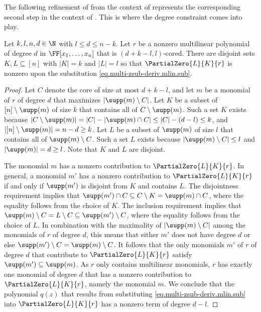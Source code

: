 The following refinement of  from the context of  represents the corresponding second step in the context of . This is where the degree constraint comes into play.

\begin{lemma}\label{lemma.rfe-hits-multiaffine-coreform}
Let \(k,l,n,d \in\N\) with $l \le d \le n-k$. 
Let \(r\) be a nonzero multilinear polynomial of degree $d$ in $\FF[x_1,\dots,x_n]$ that is \((d+k-l, l)\)-cored.
There are disjoint sets \(K,L\subseteq [n]\) with \(|K|=k\) and
\(|L|=l\) so that \(\PartialZero{L}{K}{r}\) is nonzero upon the substitution \eqref{eq.multi-zsub-deriv.mlin.sub}.
\end{lemma}
\begin{proof}
  Let $C$ denote the core of size at most $d+k-l$, and let $m$ be a monomial of $r$ of degree $d$ that maximizes $|\supp(m) \setminus C|$.
  Let $K$ be a subset of $[n]\setminus \supp(m)$ of size $k$ that 
  contains all of $C \setminus \supp(m)$.
  Such a set $K$ exists because $|C \setminus \supp(m)| = |C| - |\supp(m) \cap C| \le |C| - (d-l) \le k$, and $|[n] \setminus \supp(m)| = n-d \ge k$. 
  Let $L$ be a subset of $\supp(m)$ of size $l$ that contains all of $\supp(m) \setminus C$.
  Such a set $L$ exists because $|\supp(m) \setminus C| \le l$ and $|\supp(m)| = d \ge l$. Note that $K$ and $L$ are disjoint. 
  
  The monomial $m$ has a nonzero contribution to $\PartialZero{L}{K}{r}$. In general, a monomial $m'$ has a nonzero contribution to $\PartialZero{L}{K}{r}$ if and only if $\supp(m')$ is disjoint from $K$ and contains $L$. The disjointness requirement implies that $\supp(m') \cap C \subseteq C \setminus K = \supp(m) \cap C$, where the  equality follows from the choice of $K$. The inclusion requirement implies that $\supp(m) \setminus C = L \setminus C \subseteq \supp(m') \setminus C$, where the equality follows from the choice of $L$. In combination with the maximality of $|\supp(m) \setminus C|$ among the monomials of $r$ of degree $d$, this means that either $m'$ does  not have degree $d$ or else $\supp(m')\setminus C = \supp(m) \setminus C$. It follows that the only monomials $m'$ of $r$ of degree $d$ that contribute to $\PartialZero{L}{K}{r}$ satisfy $\supp(m') \subseteq \supp(m)$. As $r$ only contains multilinear monomials, $r$ has exactly one monomial of degree $d$ that has a nonzero contribution to $\PartialZero{L}{K}{r}$, namely the monomial $m$. We conclude that the polynomial $q(z)$ that results from  substituting \eqref{eq.multi-zsub-deriv.mlin.sub} into 
  \(\PartialZero{L}{K}{r}\) has a nonzero term of degree $d-l$.
\end{proof}

